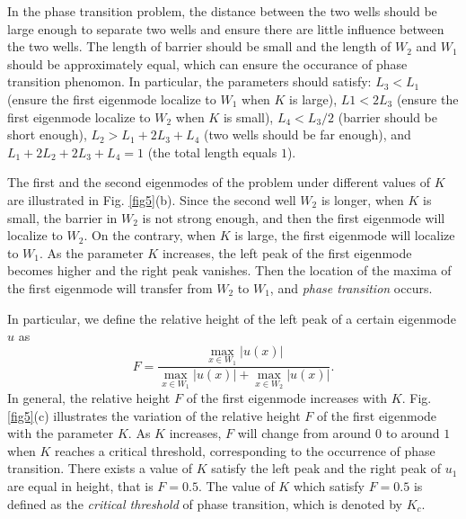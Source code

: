 \documentclass[a4paper,11pt]{article}
\begin{document}
In the phase transition problem, the distance between the two wells should be large enough to separate two wells and ensure there are little influence between the two wells. The length of barrier should be small and the length of $W_2$ and $W_1$ should be approximately equal, which can ensure the occurance of phase transition phenomon. In particular, the parameters should satisfy: $L_3 < L_1$ (ensure the first eigenmode localize to $W_1$ when $K$ is large), $L1 < 2 L_3$ (ensure the first eigenmode localize to $W_2$ when $K$ is small), $L_4 < L_3 / 2$ (barrier should be short enough), $L_2 > L_1 + 2 L_3 + L_4$ (two wells should be far enough), and $L_1 + 2 L_2 + 2 L_3 + L_4 = 1$ (the total length equals $1$).

The first and the second eigenmodes of the problem under different values of $K$ are illustrated in Fig. \ref{fig5}(b). Since the second well $W_2$ is longer, when $K$ is small, the barrier in $W_2$ is not strong enough, and then the first eigenmode will localize to $W_2$. On the contrary, when $K$ is large, the first eigenmode will localize to $W_1$. As the parameter $K$ increases, the left peak of the first eigenmode becomes higher and the right peak vanishes. Then the location of the maxima of the first eigenmode will transfer from $W_2$ to $W_1$, and \emph{phase transition} occurs.

In particular, we define the relative height of the left peak of a certain eigenmode $u$ as 
\begin{equation}
F = \frac{\max_{x \in W_1} |u(x)|}{\max_{x \in W_1} |u(x)| + \max_{x \in W_2} |u(x)|}.
\end{equation}
In general, the relative height $F$ of the first eigenmode increases with $K$. Fig. \ref{fig5}(c) illustrates the variation of the relative height $F$ of the first eigenmode with the parameter $K$. As $K$ increases, $F$ will change from around $0$ to around $1$ when $K$ reaches a critical threshold, corresponding to the occurrence of phase transition. There exists a value of $K$ satisfy the left peak and the right peak of $u_1$ are equal in height, that is $F = 0.5$. The value of $K$ which satisfy $F = 0.5$ is defined as the \emph{critical threshold} of phase transition, which is denoted by $K_c$.
\end{document}
